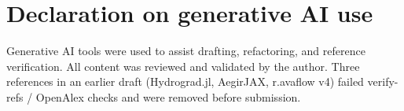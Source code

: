 \documentclass[preprint,review,12pt,authoryear]{elsarticle}
\begin{document}
\section*{Declaration on generative AI use}

Generative AI tools were used to assist drafting, refactoring, and
reference verification. All content was reviewed and validated by the
author. Three references in an earlier draft (Hydrograd.jl, AegirJAX,
r.avaflow v4) failed verify-refs / OpenAlex checks and were removed
before submission.



\end{document}

